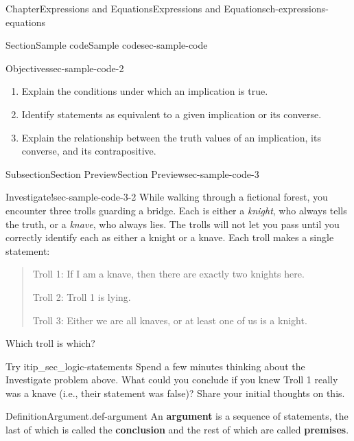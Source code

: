 \documentclass[twoside,11pt,]{book}
\newcommand{\terminology}[1]{\textbf{#1}}
\numberwithin{equation}{chapter}
\begin{document}
\begin{chapterptx}{Chapter}{Expressions and Equations}{}{Expressions and Equations}{}{}{ch-expressions-equations}
\begin{sectionptx}{Section}{Sample code}{}{Sample code}{}{}{sec-sample-code}
\begin{objectives}{Objectives}{sec-sample-code-2}
%
\begin{enumerate}
\item{}Explain the conditions under which an implication is true.%
\item{}Identify statements as equivalent to a given implication or its converse.%
\item{}Explain the relationship between the truth values of an implication, its converse, and its contrapositive.%
\end{enumerate}
\end{objectives}
%
%
\typeout{************************************************}
\typeout{************************************************}
%
\begin{subsectionptx}{Subsection}{Section Preview}{}{Section Preview}{}{}{sec-sample-code-3}
\begin{investigation}{Investigate!}{}{sec-sample-code-3-2}%
%
%
%
%
While walking through a fictional forest, you encounter three trolls guarding a bridge. Each is either a \emph{knight}, who always tells the truth, or a \emph{knave}, who always lies. The trolls will not let you pass until you correctly identify each as either a knight or a knave. Each troll makes a single statement:%
\begin{quote}%
Troll 1: If I am a knave, then there are exactly two knights here.%
\par
Troll 2: Troll 1 is lying.%
\par
Troll 3: Either we are all knaves, or at least one of us is a knight.%
\end{quote}
Which troll is which? %
\end{investigation}%
\begin{inlineexercise}{Try it}{}{ip_sec_logic-statements}%
Spend a few minutes thinking about the Investigate problem above.  What could you conclude if you knew Troll 1 really was a knave (i.e., their statement was false)?  Share your initial thoughts on this.%
\end{inlineexercise}%
\end{subsectionptx}
\begin{definition}{Definition}{Argument.}{def-argument}%
%
%
%
%
%
%
An \terminology{argument}  is a sequence of statements, the last of which is called the \terminology{conclusion}  and the rest of which are called \terminology{premises}. %

\end{definition}
\end{sectionptx}
\end{chapterptx}
\end{document}

